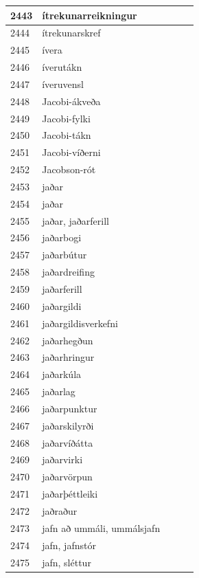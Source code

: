 \begin{longtable}{p{}|p{}|p{}|p{}|p{}}
\hline
2443 & ítrekunarreikningur &  &  &  \\
\hline
2444 & ítrekunarskref &  &  &  \\
\hline
2445 & ívera &  &  &  \\
\hline
2446 & íverutákn &  &  &  \\
\hline
2447 & íveruvensl &  &  &  \\
\hline
2448 & Jacobi-ákveða &  &  &  \\
\hline
2449 & Jacobi-fylki &  &  &  \\
\hline
2450 & Jacobi-tákn &  &  &  \\
\hline
2451 & Jacobi-víðerni &  &  &  \\
\hline
2452 & Jacobson-rót &  &  &  \\
\hline
2453 & jaðar &  &  &  \\
\hline
2454 & jaðar &  &  &  \\
\hline
2455 & jaðar, jaðarferill &  &  &  \\
\hline
2456 & jaðarbogi &  &  &  \\
\hline
2457 & jaðarbútur &  &  &  \\
\hline
2458 & jaðardreifing &  &  &  \\
\hline
2459 & jaðarferill &  &  &  \\
\hline
2460 & jaðargildi &  &  &  \\
\hline
2461 & jaðargildisverkefni &  &  &  \\
\hline
2462 & jaðarhegðun &  &  &  \\
\hline
2463 & jaðarhringur &  &  &  \\
\hline
2464 & jaðarkúla &  &  &  \\
\hline
2465 & jaðarlag &  &  &  \\
\hline
2466 & jaðarpunktur &  &  &  \\
\hline
2467 & jaðarskilyrði &  &  &  \\
\hline
2468 & jaðarvíðátta &  &  &  \\
\hline
2469 & jaðarvirki &  &  &  \\
\hline
2470 & jaðarvörpun &  &  &  \\
\hline
2471 & jaðarþéttleiki &  &  &  \\
\hline
2472 & jaðraður &  &  &  \\
\hline
2473 & jafn að ummáli, ummálsjafn &  &  &  \\
\hline
2474 & jafn, jafnstór &  &  &  \\
\hline
2475 & jafn, sléttur &  &  &  \\

\end{longtable}
